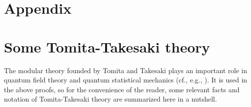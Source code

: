 \documentclass[a4paper,11pt]{article}
\begin{document}
\begin{appendix}
\section*{Appendix}

\section{Some Tomita-Takesaki theory}\label{TTTheory}
The modular theory
founded by Tomita and Takesaki \cite{Tak} plays an important
role in quantum field theory and quantum statistical mechanics (cf., e.g.,
\cite{Haa92,Bor00}). It is used in the above proofs, so
for the convenience of the reader, some
relevant facts and notation of Tomita-Takesaki theory are
summarized here in a nutshell.


\end{appendix}
\end{document}
